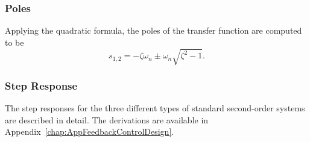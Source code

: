 \subsubsection{Poles}
Applying the quadratic formula, the poles of the transfer function are computed to be
$$
s_{1,2}   =   - \zeta \omega _n \pm \omega _n\sqrt {\zeta ^2  - 1}.
$$
\subsubsection{Step Response}


The step responses for the three different types of standard second-order systems are described in detail. The derivations are available in Appendix~\ref{chap:AppFeedbackControlDesign}.


   
   
   
